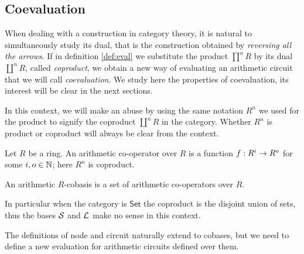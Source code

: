 \subsection{Coevaluation}
When dealing with a construction in category theory, it is natural to
simultaneously study its dual, that is the construction obtained by
\emph{reversing all the arrows}. If in definition \ref{def:eval} we
substitute the product $\prod^nR$ by its dual $\coprod^nR$, called
\emph{coproduct}, we obtain a new way of evaluating an arithmetic
circuit that we will call \emph{coevaluation}. We study here the
properties of coevaluation, its interest will be clear in the next
sections.

In this context, we will make an abuse by using the same notation
$R^n$ we used for the product to signify the coproduct $\coprod^nR$ in
the category. Whether $R^n$ is product or coproduct will always be
clear from the context.

\begin{definition}
  Let $R$ be a ring. An arithmetic co-operator over $R$ is a function
  $f:R^i\rightarrow R^o$ for some $i,o\in\mathbb{N}$; here $R^n$ is coproduct.

  An arithmetic $R$-cobasis is a set of arithmetic co-operators over
  $R$.
\end{definition}

In particular when the category is $\mathsf{Set}$ the coproduct is the
disjoint union of sets, thus the bases $\mathcal{S}$ and $\mathcal{L}$ make no
sense in this context.

The definitions of node and circuit naturally extend to cobases, but
we need to define a new evaluation for arithmetic circuits defined
over them.

